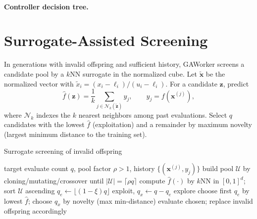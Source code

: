 \documentclass[12pt,a4paper]{article}
\begin{document}
\paragraph{Controller decision tree.}
\begin{center}
\end{center}

\section{Surrogate-Assisted Screening}
In generations with invalid offspring and sufficient history, GAWorker screens a candidate pool by a $k$NN surrogate in the normalized cube. Let $\tilde{\bm{x}}$ be the normalized vector with $\tilde{x}_i=(x_i-\ell_i)/(u_i-\ell_i)$. For a candidate $\bm{z}$, predict
\[ \hat{f}(\bm{z}) = \frac{1}{k} \sum_{j \in \mathcal{N}_k(\tilde{\bm{z}})} y_j, \qquad y_j = f(\bm{x}^{(j)}), \]
where $\mathcal{N}_k$ indexes the $k$ nearest neighbors among past evaluations. Select $q$ candidates with the lowest $\hat{f}$ (exploitation) and a remainder by maximum novelty (largest minimum distance to the training set).

\begin{algorithm}[H]
\caption{Surrogate screening of invalid offspring}
\begin{algorithmic}[1]
\Require target evaluate count $q$, pool factor $\rho>1$, history $\{(\bm{x}^{(j)},y_j)\}$
\State build pool $\mathcal{U}$ by cloning/mutating/crossover until $|\mathcal{U}|=\lceil \rho q\rceil$
\State compute $\hat{f}(\cdot)$ by $k$NN in $[0,1]^d$; sort $\mathcal{U}$ ascending
\State $q_e\leftarrow \lfloor (1-\xi) q\rfloor$ exploit, $q_x\leftarrow q-q_e$ explore
\State choose first $q_e$ by lowest $\hat{f}$; choose $q_x$ by novelty (max min-distance)
\State evaluate chosen; replace invalid offspring accordingly
\end{algorithmic}
\end{algorithm}
\end{document}
